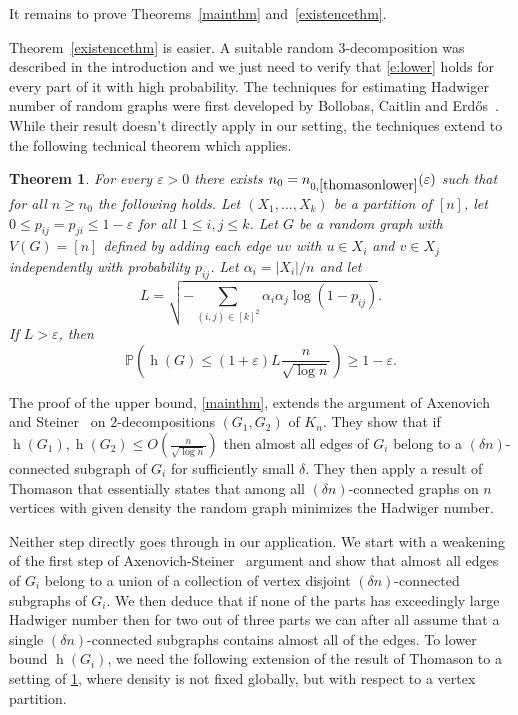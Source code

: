 \documentclass{article}
\newtheorem{thm}{Theorem}[section]
\newcommand{\eps}{\varepsilon}
\newcommand{\fs}[2]{\left(\frac{#1}{#2}\right)}
\newcommand{\s}[1]{\left(#1\right)}
\newcommand{\Prob}{\mathbb{P}}
\DeclareMathOperator{\had}{h}
\begin{document}
It remains to prove Theorems~\ref{mainthm} and~\ref{existencethm}. 

 Theorem~\ref{existencethm}  is easier. A suitable random $3$-decomposition was described in the introduction and we just need to verify that \eqref{e:lower} holds for every part of it with high probability. The techniques for estimating Hadwiger number of random graphs were first developed by Bollobas, Caitlin and Erd\H{o}s~\cite{}. While their result doesn't directly apply in our setting, the techniques extend to the following technical theorem which applies.

\begin{thm}\label{thomasonlower} For every $\eps > 0$ there exists $n_0=n_{0,\ref{thomasonlower}}(\eps)$ such that for all $n \geq n_0$ the following holds. Let $(X_1, \ldots, X_k)$ be a partition of $[n]$, let $0 \leq p_{ij}=p_{ji} \leq 1 -\eps$ for all $1 \leq i,j \leq k$. Let $G$ be a random graph with $V(G)=[n]$ defined by adding each edge $uv$ with $u \in X_i$ and $v \in X_j$ independently with probability $p_{ij}$. Let $\alpha_i = |X_i|/n$ and let
 	$$L = \sqrt{-\sum_{(i,j) \in [k]^2} \alpha_i\alpha_j\log\s{1-p_{ij}}}.$$
 	If $L > \eps$, then 
 \begin{equation}\label{e:tlower}\Prob \s{\had(G) \leq (1 +\eps) L\frac{n}{\sqrt{\log n}}} \geq 1 -\eps.\end{equation}
\end{thm}

The proof of the upper bound, \cref{mainthm}, extends the argument of Axenovich and Steiner~\cite{2603.10510} on $2$-decompositions $(G_1,G_2)$ of $K_n$. They show that if  $\had(G_1),\had(G_2) \leq O\fs{n}{\sqrt{\log n}}$  then almost all edges of $G_i$ belong to a $(\delta n)$-connected subgraph of $G_i$ for sufficiently small $\delta$.  They then apply a result of Thomason that essentially states that among all $(\delta n)$-connected graphs on $n$ vertices with given density the random graph minimizes the Hadwiger number.

Neither step directly goes through in our application.  We start with a weakening of the first step of Axenovich-Steiner~\cite{2603.10510} argument and show that almost all edges of $G_i$ belong to a union of a collection of vertex disjoint  $(\delta n)$-connected subgraphs of $G_i$. We then deduce that if none of the parts has exceedingly large Hadwiger number then for two out of three parts we can after all assume that a single $(\delta n)$-connected subgraphs contains almost all of the edges. To lower bound $\had(G_i)$, we need the following extension of the result of Thomason to a setting of \cref{thomasonlower}, where density is not fixed globally, but with respect to a vertex partition. 
\end{document}
